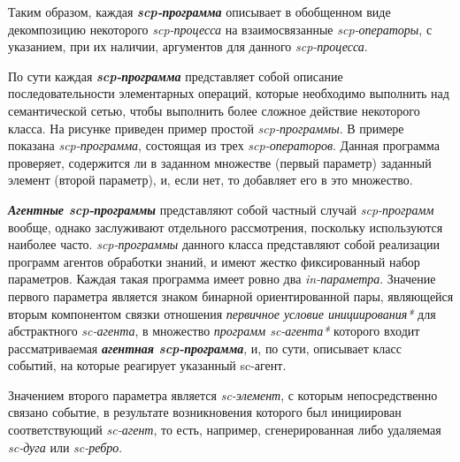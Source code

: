 \begin{frame}{}
\topline
\justifying
\vspace{10mm}

Таким образом, каждая \textbf{\textit{scp-программа}} описывает в обобщенном виде декомпозицию некоторого \textit{\mbox{scp-процесса}} на взаимосвязанные \textit{scp-операторы}, с указанием, при их наличии, аргументов для данного \textit{scp-процесса}.

По сути каждая \textbf{\textit{scp-программа}} представляет собой описание последовательности элементарных операций, которые необходимо выполнить над семантической сетью, чтобы выполнить более сложное действие некоторого класса.
На рисунке приведен пример простой \textit{scp-программы}. В примере показана \textit{scp-программа}, состоящая из трех \textit{scp-операторов}. Данная программа проверяет, содержится ли в заданном множестве (первый параметр) заданный элемент (второй параметр), и, если нет, то добавляет его в это множество.
\end{frame}


\begin{frame}{}
\topline
\justifying
\vspace{10mm}

\textbf{\textit{Агентные scp-программы}} представляют собой частный случай \textit{scp-программ} вообще, однако заслуживают отдельного рассмотрения, поскольку используются наиболее часто. \textit{scp-программы} данного класса представляют собой реализации программ агентов обработки знаний, и имеют жестко фиксированный набор параметров. Каждая такая программа имеет ровно два \textit{in-параметра\scnrolesign}. Значение первого параметра является знаком бинарной ориентированной пары, являющейся вторым компонентом связки отношения \textit{первичное условие инициирования*} для абстрактного \textit{sc-агента}, в множество \textit{программ sc-агента*} которого входит рассматриваемая \textbf{\textit{агентная scp-программа}}, и, по сути, описывает класс событий, на которые реагирует указанный sc-агент.
	
Значением второго параметра является \textit{sc-элемент}, с которым непосредственно связано событие, в результате возникновения которого был инициирован соответствующий \textit{sc-агент}, то есть, например, сгенерированная либо удаляемая \textit{sc-дуга} или \textit{sc-ребро}.
\end{frame}


